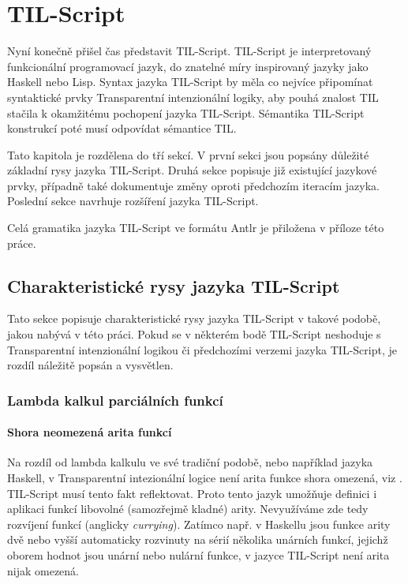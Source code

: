 \chapter{TIL-Script}\label{tilscript-chapter}

Nyní konečně přišel čas představit TIL-Script. TIL-Script je interpretovaný funkcionální
programovací jazyk, do znatelné míry inspirovaný jazyky jako Haskell nebo Lisp. Syntax jazyka
TIL-Script by měla co nejvíce připomínat syntaktické prvky Transparentní intenzionální logiky, aby
pouhá znalost TIL stačila k okamžitému pochopení jazyka TIL-Script. Sémantika TIL-Script konstrukcí
poté musí odpovídat sémantice TIL.

Tato kapitola je rozdělena do tří sekcí. V první sekci jsou popsány důležité základní rysy jazyka
TIL-Script. Druhá sekce popisuje již existující jazykové prvky, případně také dokumentuje změny
oproti předchozím iteracím jazyka. Poslední sekce navrhuje rozšíření jazyka TIL-Script.

Celá gramatika jazyka TIL-Script ve formátu Antlr je přiložena v příloze této práce.

\section{Charakteristické rysy jazyka TIL-Script}

Tato sekce popisuje charakteristické rysy jazyka TIL-Script v takové podobě, jakou nabývá v této
práci. Pokud se v některém bodě TIL-Script neshoduje s Transparentní intenzionální logikou či
předchozími verzemi jazyka TIL-Script, je rozdíl náležitě popsán a vysvětlen.

\subsection{Lambda kalkul parciálních funkcí}

\subsubsection{Shora neomezená arita funkcí}

Na rozdíl od lambda kalkulu ve své tradiční podobě, nebo například jazyka Haskell, v Transparentní
intezionální logice není arita funkce shora omezená, viz . TIL-Script musí tento
fakt reflektovat. Proto tento jazyk umožňuje definici i aplikaci funkcí libovolné (samozřejmě
kladné) arity. Nevyužíváme zde tedy rozvíjení funkcí (anglicky \textit{currying})\cite{partiality}.
Zatímco např. v Haskellu jsou funkce arity dvě nebo vyšší automaticky rozvinuty na sérií několika
unárních funkcí, jejichž oborem hodnot jsou unární nebo nulární funkce, v jazyce TIL-Script není
arita nijak omezená.

